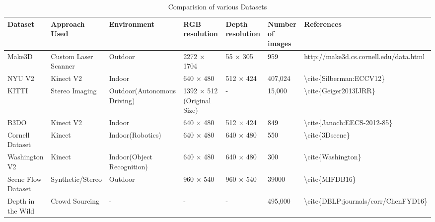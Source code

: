 \begin{table}[]
\begin{tabular}{lllllll}
\hline
{\textbf{Dataset}} & {\textbf{Approach Used}} & \textbf{Environment}        & \textbf{RGB resolution}           & \textbf{Depth resolution} & \textbf{Number of images} & \textbf{References}                                  \\ \hline
Make3D                                & Custom Laser Scanner                      & Outdoor                     & 2272 $\times$ 1704                & 55 $\times$ 305           & 959                       & http://make3d.cs.cornell.edu/data.html               \\ \hline
NYU V2                                 & Kinect V2                                   & Indoor                      & 640 $\times$ 480                  & 512 $\times$ 424          & 407,024                   & \textbackslash{}cite\{Silberman:ECCV12\}             \\ \hline
KITTI                                  & Stereo Imaging                              & Outdoor(Autonomous Driving) & 1392 $\times$ 512 (Original Size) & -                         & 15,000                    & \textbackslash{}cite\{Geiger2013IJRR\}               \\ \hline
B3DO                                   & Kinect V2                                   & Indoor                      & 640 $\times$ 480                  & 512 $\times$ 424          & 849                       & \textbackslash{}cite\{Janoch:EECS-2012-85\}          \\ \hline
Cornell Dataset                        & Kinect                                      & Indoor(Robotics)            & 640 $\times$ 480                  & 640 $\times$ 480          & 550                       & \textbackslash{}cite\{3Dscene\}                      \\ \hline
Washington V2                          & Kinect                                      & Indoor(Object Recognition)  & 640 $\times$ 480                  & 640 $\times$ 480          & 300                       & \textbackslash{}cite\{Washington\}                   \\ \hline
Scene Flow Dataset                     & Synthetic/Stereo                            & Outdoor                     & 960 $\times$ 540                  & 960 $\times$ 540          & 39000                     & \textbackslash{}cite\{MIFDB16\}                      \\ \hline
Depth in the Wild                      & Crowd Sourcing                              & -                           & -                                 & -                         & 495,000                   & \textbackslash{}cite\{DBLP:journals/corr/ChenFYD16\} \\ \hline
\end{tabular}
\caption{Comparision of various Datasets}
\label{table:DatasetComparision}
\end{table}

